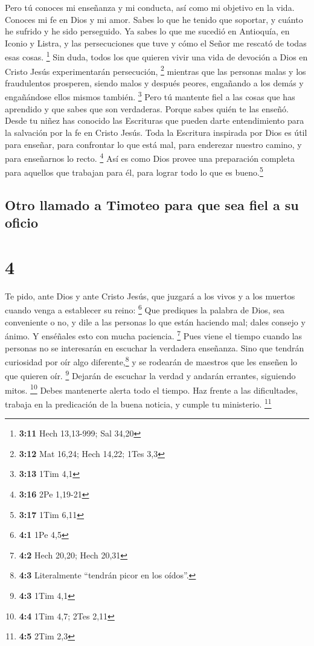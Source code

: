  Pero tú conoces mi enseñanza y mi conducta, así como mi
objetivo en la vida. Conoces mi fe en Dios y mi amor. Sabes lo que he
tenido que soportar,  y cuánto he sufrido y he sido
perseguido. Ya sabes lo que me sucedió en Antioquía, en Iconio y Listra,
y las persecuciones que tuve y cómo el Señor me rescató de todas esas
cosas. \footnote{\textbf{3:11} Hech 13,13-999; Sal 34,20}
 Sin duda, todos los que quieren vivir una vida de
devoción a Dios en Cristo Jesús experimentarán persecución, \footnote{\textbf{3:12}
  Mat 16,24; Hech 14,22; 1Tes 3,3}  mientras que las
personas malas y los fraudulentos prosperen, siendo malos y después
peores, engañando a los demás y engañándose ellos mismos también.
\footnote{\textbf{3:13} 1Tim 4,1}  Pero tú mantente fiel
a las cosas que has aprendido y que sabes que son verdaderas. Porque
sabes quién te las enseñó.  Desde tu niñez has conocido
las Escrituras que pueden darte entendimiento para la salvación por la
fe en Cristo Jesús.  Toda la Escritura inspirada por Dios
es útil para enseñar, para confrontar lo que está mal, para enderezar
nuestro camino, y para enseñarnos lo recto. \footnote{\textbf{3:16} 2Pe
  1,19-21}  Así es como Dios provee una preparación
completa para aquellos que trabajan para él, para lograr todo lo que es
bueno.\footnote{\textbf{3:17} 1Tim 6,11}

\hypertarget{otro-llamado-a-timoteo-para-que-sea-fiel-a-su-oficio}{%
\subsection{Otro llamado a Timoteo para que sea fiel a su
oficio}\label{otro-llamado-a-timoteo-para-que-sea-fiel-a-su-oficio}}

\hypertarget{section-3}{%
\section{4}\label{section-3}}

 Te pido, ante Dios y ante Cristo Jesús, que juzgará a los
vivos y a los muertos cuando venga a establecer su reino: \footnote{\textbf{4:1}
  1Pe 4,5}  Que prediques la palabra de Dios, sea
conveniente o no, y dile a las personas lo que están haciendo mal; dales
consejo y ánimo. Y enséñales esto con mucha paciencia. \footnote{\textbf{4:2}
  Hech 20,20; Hech 20,31}  Pues viene el tiempo cuando las
personas no se interesarán en escuchar la verdadera enseñanza. Sino que
tendrán curiosidad por oír algo diferente,\footnote{\textbf{4:3}
  Literalmente ``tendrán picor en los oídos''.} y se rodearán de
maestros que les enseñen lo que quieren oír. \footnote{\textbf{4:3} 1Tim
  4,1}  Dejarán de escuchar la verdad y andarán errantes,
siguiendo mitos. \footnote{\textbf{4:4} 1Tim 4,7; 2Tes 2,11}
 Debes mantenerte alerta todo el tiempo. Haz frente a las
dificultades, trabaja en la predicación de la buena noticia, y cumple tu
ministerio. \footnote{\textbf{4:5} 2Tim 2,3}


